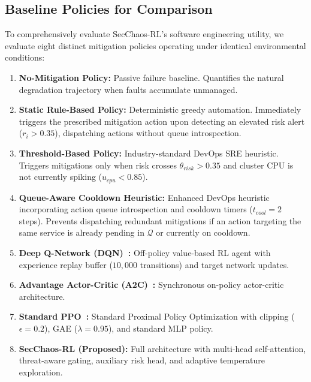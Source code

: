 \documentclass[11pt,a4paper]{article}
\begin{document}
\subsection{Baseline Policies for Comparison}
To comprehensively evaluate SecChaos-RL's software engineering utility, we evaluate eight distinct mitigation policies operating under identical environmental conditions:
\begin{enumerate}
    \item \textbf{No-Mitigation Policy:} Passive failure baseline. Quantifies the natural degradation trajectory when faults accumulate unmanaged.
    \item \textbf{Static Rule-Based Policy:} Deterministic greedy automation. Immediately triggers the prescribed mitigation action upon detecting an elevated risk alert ($r_i > 0.35$), dispatching actions without queue introspection.
    \item \textbf{Threshold-Based Policy:} Industry-standard DevOps SRE heuristic. Triggers mitigations only when risk crosses $\theta_{risk} > 0.35$ and cluster CPU is not currently spiking ($u_{cpu} < 0.85$).
    \item \textbf{Queue-Aware Cooldown Heuristic:} Enhanced DevOps heuristic incorporating action queue introspection and cooldown timers ($t_{cool} = 2$ steps). Prevents dispatching redundant mitigations if an action targeting the same service is already pending in $\mathcal{Q}$ or currently on cooldown.
    \item \textbf{Deep Q-Network (DQN)~\cite{mnih2015human}:} Off-policy value-based RL agent with experience replay buffer ($10,000$ transitions) and target network updates.
    \item \textbf{Advantage Actor-Critic (A2C)~\cite{mnih2016asynchronous}:} Synchronous on-policy actor-critic architecture.
    \item \textbf{Standard PPO~\cite{schulman2017ppo}:} Standard Proximal Policy Optimization with clipping ($\epsilon = 0.2$), GAE ($\lambda = 0.95$), and standard MLP policy.
    \item \textbf{SecChaos-RL (Proposed):} Full architecture with multi-head self-attention, threat-aware gating, auxiliary risk head, and adaptive temperature exploration.
\end{enumerate}
\end{document}
